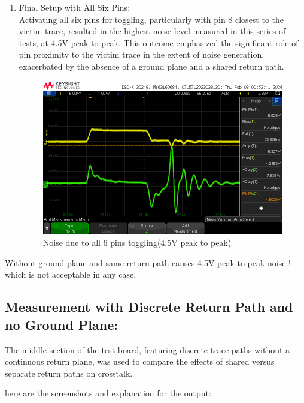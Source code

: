 \documentclass[a4paper,11pt]{article}%
\begin{document}
\begin{enumerate}
	\item Final Setup with All Six Pins:\\ Activating all six pins for toggling, particularly with pin 8 closest to the victim trace, resulted in the highest noise level measured in this series of tests, at 4.5V peak-to-peak. This outcome emphasized the significant role of pin proximity to the victim trace in the extent of noise generation, exacerbated by the absence of a ground plane and a shared return path.
	\begin{figure}[H]
		\centering
		\includegraphics[scale=0.5]{figures/noise_np__cr6.png}
		\caption{Noise due to all 6 pins toggling(4.5V peak to peak)}
		\label{noise_np__cr6}
	\end{figure}
	
\end{enumerate}
Without ground plane and same return path causes 4.5V peak to peak noise ! which is not acceptable in any case.

\subsection{Measurement with Discrete Return Path and no Ground Plane:}
The middle section of the test board, featuring discrete trace paths without a continuous return plane, was used to compare the effects of shared versus separate return paths on crosstalk.


here are the screenshots and explanation for the output:
\end{document}
